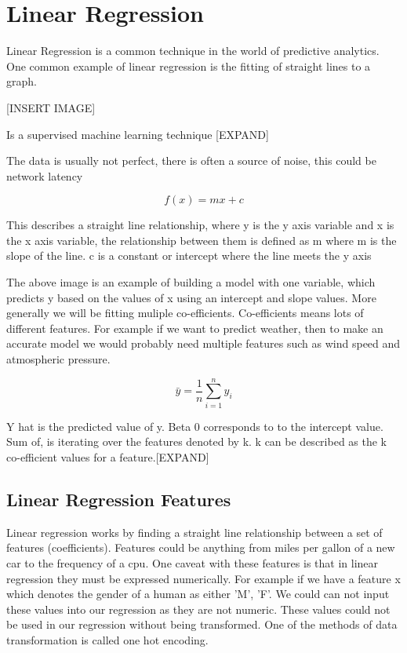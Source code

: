\section{Linear Regression}

Linear Regression is a common technique in the world of predictive analytics. One common example of linear regression is the fitting of straight lines to a graph. 

[INSERT IMAGE]

Is a supervised machine learning technique [EXPAND]

The data is usually not perfect, there is often a source of noise, this could be network latency

\begin{equation}
    f(x) = mx+c
\end{equation}

This describes a straight line relationship, where y is the y axis variable and x is the x axis variable, the relationship between them is defined as m where m is the slope of the line. c is a constant or intercept where the line meets the y axis

The above image is an example of building a model with one variable, which predicts y based on the values of x using an intercept and slope values. More generally we will be fitting muliple co-efficients. Co-efficients means lots of different features. For example if we want to predict weather, then to make an accurate model we would probably need multiple features such as wind speed and atmospheric pressure.

\begin{equation}
\bar{y} = \frac{1}{n}\sum_{i=1}^n y_i
\end{equation}

Y hat is the predicted value of y. Beta 0 corresponds to to the intercept value. Sum of, is iterating over the features denoted by k. k can be described as the k co-efficient values for a feature.[EXPAND]

\subsection*{Linear Regression Features}

Linear regression works by finding a straight line relationship between a set of features (coefficients). Features could be anything from miles per gallon of a new car to the frequency of a cpu. One caveat with these features is that in linear regression they must be expressed numerically. For example if we have a feature x which denotes the gender of a human as either 'M', 'F'. We could can not input these values into our regression as they are not numeric. These values could not be used in our regression without being transformed. One of the methods of data transformation is called one hot encoding. 

